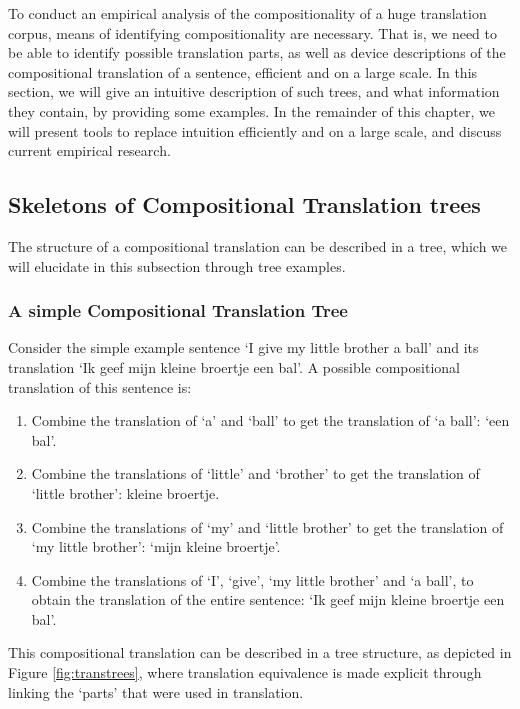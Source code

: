 To conduct an empirical analysis of the compositionality of a huge translation corpus, means of identifying compositionality are necessary. That is, we need to be able to identify possible translation parts, as well as device descriptions of the compositional translation of a sentence, efficient and on a large scale. In this section, we will give an intuitive description of such trees, and what information they contain, by providing some examples. In the remainder of this chapter, we will present tools to replace intuition efficiently and on a large scale, and discuss current empirical research.

\subsection{Skeletons of Compositional Translation trees}

The structure of a compositional translation can be described in a tree, which we will elucidate in this subsection through tree examples.

\subsubsection{A simple Compositional Translation Tree}

Consider the simple example sentence `I give my little brother a ball' and its translation `Ik geef mijn kleine broertje een bal'. A possible compositional translation of this sentence is:\begin{enumerate}
\item Combine the translation of `a' and `ball' to get the translation of `a ball': `een bal'.
\item Combine the translations of `little' and `brother' to get the translation of `little brother': kleine broertje.
\item Combine the translations of `my' and `little brother' to get the translation of `my little brother': `mijn kleine broertje'.
\item Combine the translations of `I', `give', `my little brother' and `a ball', to obtain the translation of the entire sentence: `Ik geef mijn kleine broertje een bal'.
\end{enumerate}

This compositional translation can be described in a tree structure, as depicted in Figure \ref{fig:transtrees}, where translation equivalence is made explicit through linking the `parts' that were used in translation.

